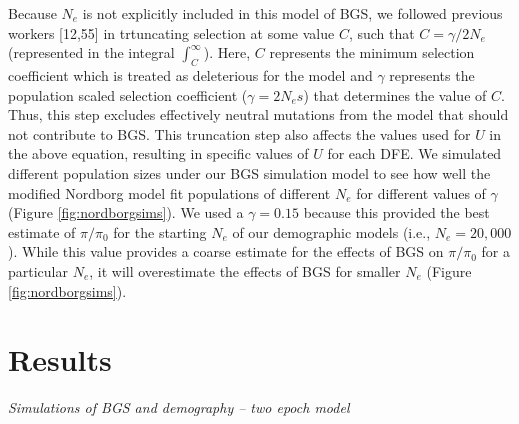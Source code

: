 \documentclass[9pt,twocolumn,twoside]{rilabRxiv}
\begin{document}
Because $N_e$ is not explicitly included in this model of BGS, we followed previous workers [12,55] in trtuncating selection at some value $C$,
such that $C = \gamma/2N_e$ (represented in the integral $\int^{\infty}_C$).
Here, $C$ represents the minimum selection coefficient which is treated as deleterious for the model and $\gamma$ represents the population scaled selection coefficient ($\gamma = 2N_es$) that determines the value of $C$.
Thus, this step excludes effectively neutral mutations from the model that should not contribute to BGS.
This truncation step also affects the values used for $U$ in the above equation, resulting in specific values of $U$ for each DFE.
We simulated different population sizes under our BGS simulation model to see how well the modified Nordborg model fit populations of different $N_e$ for different values of $\gamma$ (Figure \ref{fig:nordborgsims}).
We used a $\gamma = 0.15$ because this provided the best estimate of $\pi/\pi_0$ for the starting $N_e$ of our demographic models (i.e., $N_e = 20,000$).
While this value provides a coarse estimate for the effects of BGS on $\pi/\pi_0$ for a particular $N_e$, it will overestimate the effects of BGS for smaller $N_e$ (Figure \ref{fig:nordborgsims}). 

\section{Results}


\emph{Simulations of BGS and demography -- two epoch model}
\end{document}

